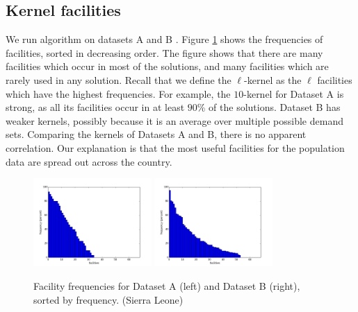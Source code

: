 \subsection*{Kernel facilities}
We run algorithm \algokernelkmed{} on datasets A and B .
Figure \ref{fig:coreset_A_and_B} shows the frequencies of facilities, sorted in decreasing order.
The figure shows that there are many facilities which occur in most of the solutions, and many facilities which are rarely used in any solution.
Recall that we define the $\ell$-kernel as the $\ell$ facilities which have the highest frequencies. For example, the $10$-kernel for Dataset A is strong, as all its facilities occur in at least $90$\% of the solutions. Dataset B has weaker kernels, possibly because it is an average over multiple possible demand sets. Comparing the kernels of Datasets A and B, there is no apparent correlation. Our explanation is that the most useful facilities for the population data are spread out across the country.


\begin{figure}[h]
  \centering %
    \includegraphics[width=0.4\textwidth]{figs/coresetA.png}
        \includegraphics[width=0.4\textwidth]{figs/coresetB.png}
\caption{Facility frequencies for Dataset A (left) and Dataset B (right), sorted by frequency. (Sierra Leone)}
        \label{fig:coreset_A_and_B}
\end{figure}



